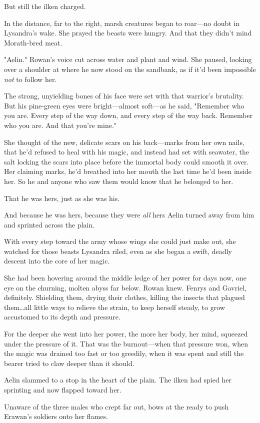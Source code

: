 But still the ilken charged.

In the distance, far to the right, marsh creatures began to roar---no doubt in Lysandra's wake.
She prayed the beasts were hungry.
And that they didn't mind Morath-bred meat.

"Aelin."
Rowan's voice cut across water and plant and wind.
She paused, looking over a shoulder at where he now stood on the sandbank, as if it'd been impossible \emph{not} to follow her.

The strong, unyielding bones of his face were set with that warrior's brutality.
But his pine-green eyes were bright---almost soft---as he said, "Remember who you are.
Every step of the way down, and every step of the way back.
Remember who you are.
And that you're mine."

She thought of the new, delicate scars on his back---marks from her own nails, that he'd refused to heal with his magic, and instead had set with seawater, the salt locking the scars into place before the immortal body could smooth it over.
Her claiming marks, he'd breathed into her mouth the last time he'd been inside her.
So he and anyone who saw them would know that he belonged to her.

That he was hers, just as she was his.

And because he was hers, because they were \emph{all} hers 
Aelin turned away from him and sprinted across the plain.

With every step toward the army whose wings she could just make out, she watched for those beasts Lysandra riled, even as she began a swift, deadly descent into the core of her magic.

She had been hovering around the middle ledge of her power for days now, one eye on the churning, molten abyss far below.
Rowan knew.
Fenrys and Gavriel, definitely.
Shielding them, drying their clothes, killing the insects that plagued them\ldots all little ways to relieve the strain, to keep herself steady, to grow accustomed to its depth and pressure.

For the deeper she went into her power, the more her body, her mind, squeezed under the pressure of it.
That was the burnout---when that pressure won, when the magic was drained too fast or too greedily, when it was spent and still the bearer tried to claw deeper than it should.

Aelin slammed to a stop in the heart of the plain.
The ilken had spied her sprinting and now flapped toward her.

Unaware of the three males who crept far out, bows at the ready to push Erawan's soldiers onto her flames.

